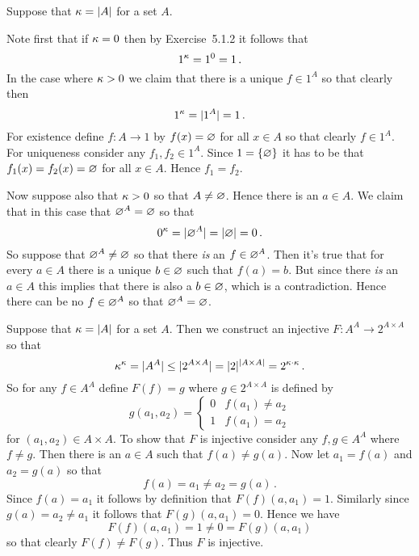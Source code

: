\begin{solution}
    Suppose that $\kappa = |A|$ for a set $A$.

    Note first that if $\kappa = 0$ then by Exercise~5.1.2 it follows that
    $$
    1^\kappa = 1^0 = 1 \,.
    $$
    In the case where $\kappa > 0$ we claim that there is a unique $f \in 1^A$ so that clearly then
    $$
    1^\kappa = |1^A| = 1 \,.
    $$
    For existence define $f:A \to 1$ by $f(x) = \varnothing$ for all $x \in A$ so that clearly $f \in 1^A$.
    For uniqueness consider any $f_1, f_2 \in 1^A$.
    Since $1 = \left\{ \varnothing \right\}$ it has to be that $f_1(x) = f_2(x) = \varnothing$ for all $x \in A$.
    Hence $f_1 = f_2$.

    Now suppose also that $\kappa > 0$ so that $A \neq \varnothing$.
    Hence there is an $a \in A$.
    We claim that in this case that $\varnothing^A = \varnothing$ so that
    $$
    0^\kappa = |\varnothing^A| = |\varnothing| = 0 \,.
    $$
    So suppose that $\varnothing^A \neq \varnothing$ so that there \emph{is} an $f \in \varnothing^A$.
    Then it's true that for every $a \in A$ there is a unique $b \in \varnothing$ such that $f(a) = b$.
    But since there \emph{is} an $a \in A$ this implies that there is also a $b \in \varnothing$, which is a contradiction.
    Hence there can be no $f \in \varnothing^A$ so that $\varnothing^A = \varnothing$. \qedsymbol
\end{solution}


\begin{solution}
    Suppose that $\kappa = |A|$ for a set $A$.
    Then we construct an injective $F : A^A \to 2^{A \times A}$ so that
    $$
    \kappa^\kappa = |A^A| \leq |2^{A \times A}| = |2|^{|A \times A|} = 2^{\kappa \cdot \kappa} \,.
    $$
    So for any $f \in A^A$ define $F(f) = g$ where $g \in 2^{A\times A}$ is defined by
    $$
    g(a_1, a_2) =
    \begin{cases}
        0 & f(a_1) \neq a_2 \\
        1 & f(a_1) = a_2
    \end{cases}
    $$
    for $(a_1, a_2) \in A \times A$.
    To show that $F$ is injective consider any $f,g \in A^A$ where $f \neq g$.
    Then there is an $a \in A$ such that $f(a) \neq g(a)$.
    Now let $a_1 = f(a)$ and $a_2 = g(a)$ so that
    $$
    f(a) = a_1 \neq a_2 = g(a) \,.
    $$
    Since $f(a) = a_1$ it follows by definition that $F(f)(a,a_1) = 1$.
    Similarly since $g(a) = a_2  \neq a_1$ it follows that $F(g)(a,a_1) = 0$.
    Hence we have
    $$
    F(f)(a, a_1) = 1 \neq 0 = F(g)(a, a_1)
    $$
    so that clearly $F(f) \neq F(g)$.
    Thus $F$ is injective. \qedsymbol
\end{solution}

